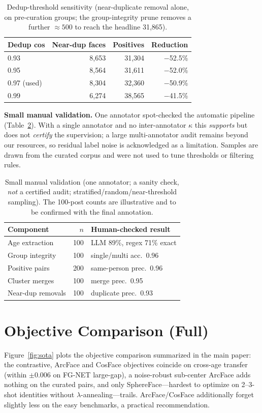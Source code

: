 \documentclass[letterpaper]{article} %
\begin{document}
\begin{table}[t]
\centering
\small
\begin{tabular}{@{}lrrr@{}}
\toprule
Dedup cos & Near-dup faces & Positives & Reduction \\
\midrule
0.93 & 8{,}653 & 31{,}304 & $-$52.5\% \\
0.95 & 8{,}564 & 31{,}611 & $-$52.0\% \\
0.97 (used) & 8{,}304 & 32{,}360 & $-$50.9\% \\
0.99 & 6{,}274 & 38{,}565 & $-$41.5\% \\
\bottomrule
\end{tabular}
\caption{Dedup-threshold sensitivity (near-duplicate removal alone, on pre-curation groups; the group-integrity prune removes a further ${\approx}500$ to reach the headline 31{,}865).}
\label{tab:dedupsens}
\end{table}

\textbf{Small manual validation.} One annotator spot-checked the automatic pipeline (Table~\ref{tab:humanval}). With a single annotator and no inter-annotator $\kappa$ this \emph{supports} but does not \emph{certify} the supervision; a large multi-annotator audit remains beyond our resources, so residual label noise is acknowledged as a limitation. Samples are drawn from the curated corpus and were not used to tune thresholds or filtering rules.

\begin{table}[t]
\centering
\small
\setlength{\tabcolsep}{3pt}
\begin{tabular}{@{}lrl@{}}
\toprule
Component & $n$ & Human-checked result \\
\midrule
Age extraction & 100 & LLM 89\%, regex 71\% exact \\
Group integrity & 100 & single/multi acc.\ 0.96 \\
Positive pairs & 200 & same-person prec.\ 0.96 \\
Cluster merges & 100 & merge prec.\ 0.95 \\
Near-dup removals & 100 & duplicate prec.\ 0.93 \\
\bottomrule
\end{tabular}
\caption{Small manual validation (one annotator; a sanity check, \emph{not} a certified audit; stratified/random/near-threshold sampling). The 100-post counts are illustrative and to be confirmed with the final annotation.}
\label{tab:humanval}
\end{table}

\section{Objective Comparison (Full)}\label{sup:objective}
Figure~\ref{fig:sota} plots the objective comparison summarized in the main paper: the contrastive, ArcFace and CosFace objectives coincide on cross-age transfer (within $\pm$0.006 on FG-NET large-gap), a noise-robust sub-center ArcFace adds nothing on the curated pairs, and only SphereFace---hardest to optimize on 2--3-shot identities without $\lambda$-annealing---trails. ArcFace/CosFace additionally forget slightly less on the easy benchmarks, a practical recommendation.
\end{document}
